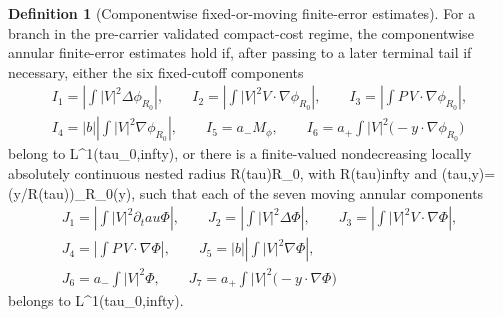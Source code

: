 \documentclass[11pt]{amsart}
\def\({}%
\def\){}%
\def\tau{tau}%
\def\infty{infty}%
\theoremstyle{plain}
\theoremstyle{definition}
\newtheorem{definition}[definition]{Definition}
\theoremstyle{remark}
\begin{document}
\begin{definition}[Componentwise fixed-or-moving finite-error estimates]
\label{paper7:def:componentwise-annular-finite-error}
For a branch in the pre-carrier validated compact-cost regime, the
componentwise annular finite-error estimates hold if, after passing to a later
terminal tail if necessary, either the six fixed-cutoff components
\[
\begin{gathered}
  I_1=\left|\int |V|^2\Delta\phi_{R_0}\right|,\qquad
  I_2=\left|\int |V|^2V\cdot\nabla\phi_{R_0}\right|,\qquad
  I_3=\left|\int P\,V\cdot\nabla\phi_{R_0}\right|,\\
  I_4=|b|\left|\int |V|^2\nabla\phi_{R_0}\right|,\qquad
  I_5=a_-M_\phi,\qquad
  I_6=a_+\int |V|^2\bigl(-y\cdot\nabla\phi_{R_0}\bigr)
\end{gathered}
\]
belong to \(L^1(\tau_0,\infty)\), or there is a finite-valued nondecreasing
locally absolutely continuous nested
radius \(R(\tau)\ge R_0\), with \(R(\tau)\to\infty\) and
\(\Phi(\tau,y)=\phi(y/R(\tau))\ge\phi_{R_0}(y)\), such that each of the seven
moving annular components
\[
\begin{gathered}
  J_1=\left|\int |V|^2\partial_\tau\Phi\right|,\qquad
  J_2=\left|\int |V|^2\Delta\Phi\right|,\qquad
  J_3=\left|\int |V|^2V\cdot\nabla\Phi\right|,\\
  J_4=\left|\int P\,V\cdot\nabla\Phi\right|,\qquad
  J_5=|b|\left|\int |V|^2\nabla\Phi\right|,\\
  J_6=a_-\int |V|^2\Phi,\qquad
  J_7=a_+\int |V|^2\bigl(-y\cdot\nabla\Phi\bigr)
\end{gathered}
\]
belongs to \(L^1(\tau_0,\infty)\).
\end{definition}
\end{document}
